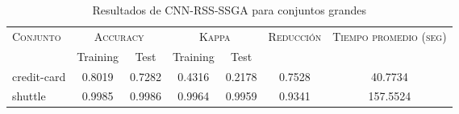 \begin{table}[]
\centering
\begin{tabular}{l c c c c c c}
\hline
\multirow{2}{*}{\textsc{Conjunto}}
	& \multicolumn{2}{c}{\textsc{Accuracy}}
	& \multicolumn{2}{c}{\textsc{Kappa}}
	& \textsc{Reducción}
	& \textsc{Tiempo promedio (seg)} \\
	& Training & Test
	& Training & Test \\ 
\hline
\hline

credit-card & 0.8019 & 0.7282 & 0.4316 & 0.2178 & 0.7528 & 40.7734 \\
shuttle & 0.9985 & 0.9986 & 0.9964 & 0.9959 & 0.9341 & 157.5524 \\

\hline
\end{tabular}
\caption{Resultados de CNN-RSS-SSGA para conjuntos grandes }
\label{res-grande-CNN-RSS-ssga}
\end{table}

